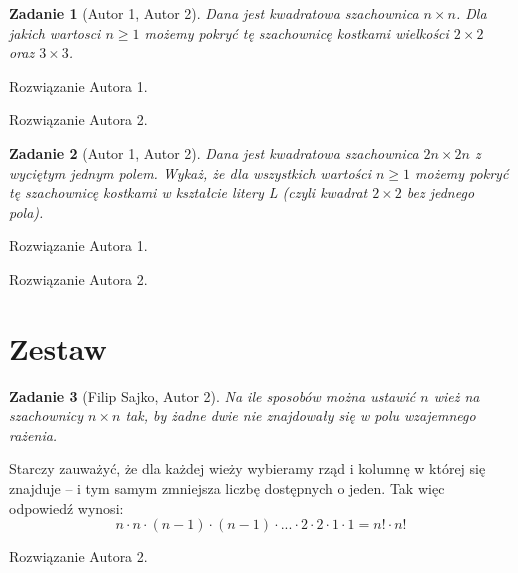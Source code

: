 \documentclass{mwart}
\newtheorem{zad}{Zadanie}[section]
\begin{document}
\begin{zad}[Autor 1, Autor 2]
    Dana jest kwadratowa szachownica $n \times n$. Dla jakich wartosci $n\geq 1$
    możemy pokryć tę szachownicę kostkami wielkości $2 \times 2$ oraz $3 \times 3$.
\end{zad}
\begin{mdframed}
    Rozwiązanie Autora 1.
\end{mdframed}
\begin{mdframed}
    Rozwiązanie Autora 2.
\end{mdframed}


\begin{zad}[Autor 1, Autor 2]
    Dana jest kwadratowa szachownica $2n \times 2n$ z wyciętym jednym polem.
    Wykaż, że dla wszystkich wartości $n \geq 1$ możemy pokryć tę szachownicę kostkami w
    kształcie litery L (czyli kwadrat $2 \times 2$ bez jednego pola).
\end{zad}
\begin{mdframed}
    Rozwiązanie Autora 1.
\end{mdframed}
\begin{mdframed}
    Rozwiązanie Autora 2.
\end{mdframed}






















\newpage
\section{Zestaw}          %

\begin{zad}[Filip Sajko, Autor 2]
    Na ile sposobów można ustawić $n$ wież na szachownicy
    $n \times n$ tak, by żadne dwie nie znajdowały się w
    polu wzajemnego rażenia.
\end{zad}
\begin{mdframed}
    Starczy zauważyć, że dla każdej wieży wybieramy rząd i kolumnę
    w której się znajduje -- i tym samym zmniejsza liczbę dostępnych
    o jeden. Tak więc odpowiedź wynosi: \[n \cdot n \cdot (n-1) \cdot
        (n-1) \cdot ... \cdot 2 \cdot 2 \cdot 1 \cdot 1 =  n! \cdot n!\]
\end{mdframed}
\begin{mdframed}
    Rozwiązanie Autora 2.
\end{mdframed}
\end{document}
